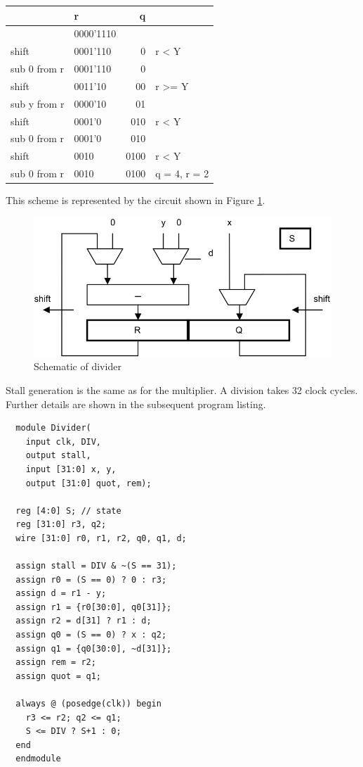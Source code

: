 \begin{table}[h!]
  \centering
  \begin{tabular}{l l r l}
                 & r         &    q \\\hline
                 & 0000'1110 &      \\
    shift        & 0001'110  &    0 & r < Y \\
    sub 0 from r & 0001'110  &    0 \\
    shift        & 0011'10   &   00 & r >= Y \\
    sub y from r & 0000'10   &   01 \\
    shift        & 0001'0    &  010 & r < Y \\
    sub 0 from r & 0001'0    &  010 \\
    shift        & 0010      & 0100 & r < Y \\
    sub 0 from r & 0010      & 0100 & q = 4, r = 2
  \end{tabular}
\end{table}

This scheme is represented by the circuit shown in Figure \ref{fig:divider}.

\begin{figure}[h!]
	\centering
	\includegraphics[width=.9\textwidth]{i/F/5.png}
	\caption{Schematic of divider}
	\label{fig:divider}
\end{figure}

Stall generation is the same as for the multiplier. A division takes 32 clock cycles. Further details
are shown in the subsequent program listing.

\begin{verbatim}
  module Divider(
    input clk, DIV,
    output stall,
    input [31:0] x, y,
    output [31:0] quot, rem);
 
  reg [4:0] S; // state
  reg [31:0] r3, q2;
  wire [31:0] r0, r1, r2, q0, q1, d;
 
  assign stall = DIV & ~(S == 31);
  assign r0 = (S == 0) ? 0 : r3;
  assign d = r1 - y;
  assign r1 = {r0[30:0], q0[31]};
  assign r2 = d[31] ? r1 : d;
  assign q0 = (S == 0) ? x : q2;
  assign q1 = {q0[30:0], ~d[31]};
  assign rem = r2;
  assign quot = q1;
  
  always @ (posedge(clk)) begin
    r3 <= r2; q2 <= q1;
    S <= DIV ? S+1 : 0;
  end
  endmodule
\end{verbatim}

